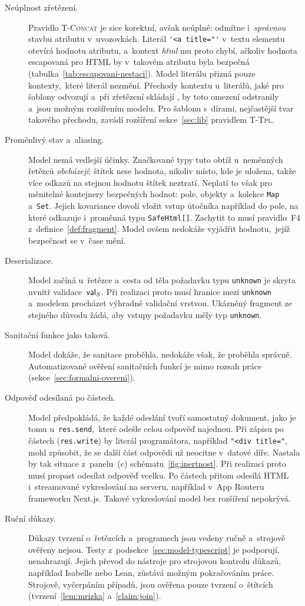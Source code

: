 \begin{description}
    \item[Neúplnost zřetězení.] Pravidlo \textsc{T-Concat} je sice korektní, avšak neúplné: odmítne i~\emph{správnou} stavbu atributu v~uvozovkách. Literál \verb|'<a title="'| v~textu elementu otevírá hodnotu atributu, a~kontext \emph{html} mu proto chybí, ačkoliv hodnota escapovaná pro HTML by v~takovém atributu byla bezpečná (tabulka~\ref{tab:escapovani-nestaci}). Model literálu přizná pouze kontexty,~které literál nezmění. Přechody kontextu u~literálů, jaké pro šablony odvozují a~při zřetězení skládají \textcite{samuel2011context}, by toto omezení odstranily a~jsou možným rozšířením modelu. Pro šablonu s~dírami, nejčastější tvar takového přechodu, zavádí rozšíření sekce~\ref{sec:lib} pravidlem \textsc{T-Tpl}.
    \item[Proměnlivý stav a~aliasing.] Model nemá vedlejší účinky. Značkované typy tuto obtíž u~neměnných řetězců \emph{obcházejí}: štítek nese hodnota, nikoliv místo, kde je uložena, takže více odkazů na stejnou hodnotu štítek neztratí. Neplatí to však pro měnitelné kontejnery bezpečných hodnot: pole, objekty a~kolekce \texttt{Map} a~\texttt{Set}. Jejich kovariance dovolí vložit vstup útočníka například do pole, na které odkazuje i~proměnná typu \texttt{SafeHtml[]}. Zachytit to musí pravidlo~F4 z~definice~\ref{def:fragment}. Model ovšem nedokáže vyjádřit hodnotu,~jejíž bezpečnost se v~čase mění.
    \item[Deserializace.] Model začíná u~řetězce a~cesta od těla požadavku typu \texttt{unknown} je skryta uvnitř validace~$\mathsf{val}_S$. Při realizaci proto musí hranice mezi \texttt{unknown} a~modelem procházet výhradně validační vrstvou. Ukázněný fragment ze stejného důvodu žádá, aby vstupy požadavku měly typ \texttt{unknown}.
    \item[Sanitační funkce jako taková.] Model dokáže, že sanitace proběhla, nedokáže však, že proběhla správně. Automatizované ověření sanitačních funkcí je mimo rozsah práce (sekce~\ref{sec:formalni-overeni}).
    \item[Odpověď odesílaná po částech.] Model předpokládá, že každé odeslání tvoří samostatný dokument, jako je tomu u~\texttt{res.send},~které odešle celou odpověď najednou. Při zápisu po částech (\texttt{res.write}) by literál programátora, například \texttt{"<div~title="}, mohl způsobit, že se další část odpovědi už neocitne v~datové díře. Nastala by tak situace z~panelu~(c) schématu~\ref{fig:inertnost}. Při realizaci proto musí propast odesílat odpověď vcelku. Po částech přitom odesílá HTML i~streamované vykreslování na serveru, například v~App Routeru frameworku Next.js. Takové vykreslování model bez rozšíření nepokrývá.
    \item[Ruční důkazy.] Důkazy tvrzení o~řetězcích a~programech jsou vedeny ručně a~strojově ověřeny nejsou. Testy z~podsekce~\ref{sec:model-typescript} je podporují, nenahrazují. Jejich převod do nástroje pro strojovou kontrolu důkazů, například Isabelle nebo Lean, zůstává možným pokračováním práce. Strojově, vyčerpáním případů, jsou ověřena pouze tvrzení o~štítcích (tvrzení~\ref{lem:mrizka} a~\ref{claim:join}).
\end{description}

